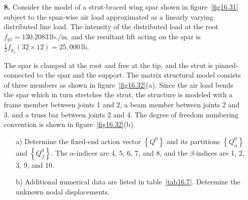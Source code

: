\documentclass{AeroStructure-ERJohnson}
\begin{document}
\begin{exercise}
\begin{enumerate}[\textbf{2.}]
\item[\textbf{8.}] Consider the model of a strut-braced wing spar shown in figure~\ref{fig16.31} subject to the span-wise air load approximated as a linearly varying distributed line load. The intensity of the distributed load at the root $f_{y 1}=130.2083\, \mathrm{lb} . / \mathrm{in}$. and the resultant lift acting on the spar is $\frac{1}{2} f_{y_{1}}(32 \times 12)=25,000\, \mathrm{lb}$.


The spar is clamped at the root and free at the tip, and the strut is pinned-connected to the spar and the support. The matrix structural model consists of three members as shown in figure~\ref{fig16.32}(a). Since the air load bends the spar which in turn stretches the strut, the structure is modeled with a frame member between joints 1 and 2, a beam member between joints 2 and 3. and a truss bar between joints 2 and 4. The degree of freedom numbering convention is shown in figure~\ref{fig16.32}(b).


\begin{enumerate}[b)]
\item[{\hskip13pt}a)] Determine the fixed-end action vector $\left\{Q^{0}\right\}$ and its partitions $\left\{Q_{\alpha}^{0}\right\}$ and $\left\{Q_{\beta}^{0}\right\}$. The $\alpha$-indices are 4, 5,\break\hspace*{35pt} 6, 7, and 8, and the $\beta$-indices are 1, 2, 3, 9, and 10.
\item[{\hskip13pt}b)] Additional numerical data are listed in table~\ref{tab16.7}. Determine the unknown nodal displacements.
\end{enumerate}
\end{enumerate}


\end{exercise}
\end{document}

